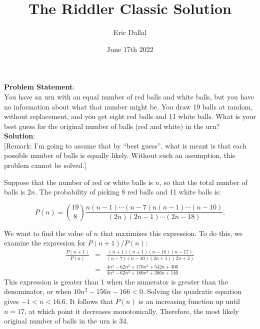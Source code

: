 \documentclass[10pt,a4paper]{article}
\title{The Riddler Classic Solution}
\date{June 17th 2022}
\author{Eric Dallal}
\begin{document}
\maketitle
\textbf{Problem Statement}:\\

You have an urn with an equal number of red balls and white balls, but you have no information about what that number might be. You draw 19 balls at random, without replacement, and you get eight red balls and 11 white balls. What is your best guess for the original number of balls (red and white) in the urn?\\

\textbf{Solution}:\\
$[$Remark: I'm going to assume that by ``best guess'', what is meant is that each possible number of balls is equally likely. Without such an assumption, this problem cannot be solved.$]$

Suppose that the number of red or white balls is $n$, so that the total number of balls is $2n$. The probability of picking 8 red balls and 11 white balls is:

\begin{equation}
P(n) = {19 \choose 8} \frac{n(n-1)\cdots(n-7) n(n-1)\cdots(n-10)}{(2n)(2n-1)\cdots(2n-18)}.
\end{equation}

We want to find the value of $n$ that maximizes this expression. To do this, we examine the expression for $P(n+1)/P(n)$:
\begin{eqnarray*}
\frac{P(n+1)}{P(n)} & = & \frac{(n+1)(n+1)(n-18)(n-17)}{(n-7)(n-10)(2n+1)(2n+2)}\\
 & = & \frac{4n^4 - 62n^3 + 170n^2 + 542n + 306}{4n^4 - 62n^3 + 180n^2 + 386n + 140}
\end{eqnarray*}
This expression is greater than 1 when the numerator is greater than the denominator, or when $10n^2 - 156n - 166 < 0$. Solving the quadratic equation gives $-1 < n < 16.6$. It follows that $P(n)$ is an increasing function up until $n = 17$, at which point it decreases monotonically. Therefore, the most likely original number of balls in the urn is 34.
\end{document}
